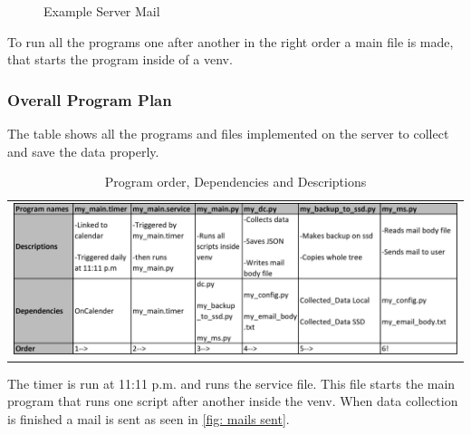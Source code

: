 \begin{figure}[H]
	\centering
	\caption{Example Server Mail}
	\label{fig: mails sent}
\end{figure}
To run all the programs one after another in the right order a main file is made, that starts the program inside of a \ac{venv}.
\subsubsection{Overall Program Plan}\label{sec: program plan}
The table shows all the programs and files implemented on the server to collect and save the data properly.
\begin{table}[H]
	\centering
	\begin{tabular}{c}
		\includegraphics[width=\textwidth]{mainpart/img/programs.png} \\
	\end{tabular}
	\caption{Program order, Dependencies and Descriptions}
	\label{tab: programs}
\end{table}
The timer is run at 11:11 p.m. and runs the service file. This file starts the main program that runs one script after another inside the \ac{venv}. When data collection is finished a mail is sent as seen in \autoref{fig: mails sent}.